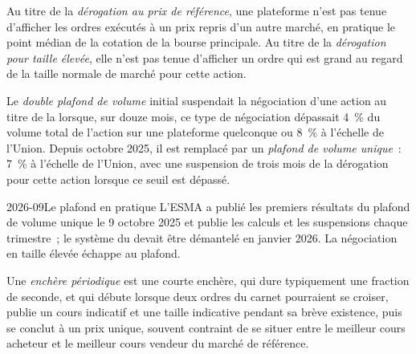 \begin{definition}\label{def:m1:european-equity-market-structure:waivers}
Au titre de la \emph{dérogation au prix de référence}, une plateforme
n'est pas tenue d'afficher les ordres exécutés à un prix repris d'un autre marché, en pratique le point médian
de la cotation de la bourse principale. Au titre de la
\emph{dérogation pour taille élevée}, elle n'est pas tenue d'afficher un ordre
qui est grand au regard de la taille normale de marché pour cette action.
\end{definition}

\begin{definition}\label{def:m1:european-equity-market-structure:cap}
Le \emph{double plafond de volume} initial suspendait la négociation
d'une action au titre de la  lorsque, sur douze mois, ce type de négociation
dépassait 4~\% du volume total de l'action sur une plateforme quelconque ou 8~\% à l'échelle de l'Union.
Depuis octobre 2025, il est remplacé par un \emph{plafond de volume
unique}~: 7~\% à l'échelle de l'Union, avec une suspension de trois mois de la dérogation pour
cette action lorsque ce seuil est dépassé.
\end{definition}

\begin{dated}{2026-09}{Le plafond en pratique}\label{dat:m1:european-equity-market-structure:svc}
L'ESMA a publié les premiers résultats du plafond de volume unique le 9 octobre 2025 et publie
les calculs et les suspensions chaque trimestre~; le système du  devait
être démantelé en janvier 2026. La négociation en taille élevée
échappe au plafond.
\end{dated}

\begin{definition}\label{def:m1:european-equity-market-structure:periodic}
Une \emph{enchère périodique} est une courte enchère, qui dure typiquement
une fraction de seconde, et qui débute lorsque deux ordres du carnet pourraient se croiser,
publie un cours indicatif et une taille indicative pendant sa brève existence, puis se conclut
à un prix unique, souvent contraint de se situer entre
le meilleur cours acheteur et le meilleur cours vendeur du marché de référence.
\end{definition}

